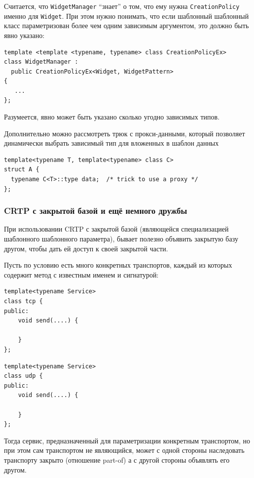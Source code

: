 \documentclass[a4paper,12pt,oneside]{article}
\begin{document}
Считается, что \lstinline!WidgetManager! ``знает'' о том, что ему нужна \lstinline!CreationPolicy! именно для \lstinline!Widget!. При этом нужно понимать, что если шаблонный шаблонный класс параметризован более чем одним зависимым аргументом, это должно быть явно указано:

\begin{lstlisting}
template <template <typename, typename> class CreationPolicyEx>
class WidgetManager : 
  public CreationPolicyEx<Widget, WidgetPattern>
{
   ...
};
\end{lstlisting}

Разумеется, явно может быть указано сколько угодно зависимых типов.

Дополнительно можно рассмотреть трюк с прокси-данными, который позволяет динамически выбрать зависимый тип для вложенных в шаблон данных

\begin{lstlisting}
template<typename T, template<typename> class C>
struct A {
  typename C<T>::type data;  /* trick to use a proxy */
};
\end{lstlisting}

\subsubsection{CRTP с закрытой базой и ещё немного дружбы}\label{ClosedCRTP}

При использовании CRTP с закрытой базой (являющейся специализацией шаблонного шаблонного параметра), бывает полезно объявить закрытую базу другом, чтобы дать ей доступ к своей закрытой части.

Пусть по условию есть много конкретных транспортов, каждый из которых содержит метод с известным именем и сигнатурой:

\begin{lstlisting}
template<typename Service>
class tcp {
public:
    void send(....) {

    }
};
\end{lstlisting}

\begin{lstlisting}
template<typename Service>
class udp {
public:
    void send(....) {

    }
};
\end{lstlisting}

Тогда сервис, предназначенный для параметризации конкретным транспортом, но при этом сам транспортом не являющийся, может с одной стороны наследовать транспорту закрыто (отношение part-of) а с другой стороны объявлять его другом.
\end{document}
